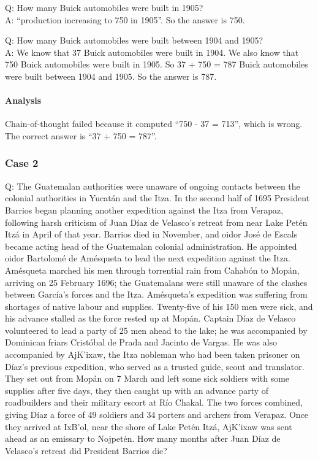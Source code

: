 Q: How many Buick automobiles were built in 1905?\\
A: ``production increasing to 750 in 1905''. So the answer is 750.

Q: How many Buick automobiles were built between 1904 and 1905?\\
A: We know that 37 Buick automobiles were built in 1904. We also know that 750 Buick automobiles were built in 1905. So 37 + 750 = 787 Buick automobiles were built between 1904 and 1905. So the answer is 787.

\paragraph{Analysis}
Chain-of-thought failed because it computed ``750 - 37 = 713'', which is wrong. The correct answer is ``37 + 750 = 787''.

\subsubsection{Case 2}
Q: The Guatemalan authorities were unaware of ongoing contacts between the colonial authorities in Yucatán and the Itza. In the second half of 1695 President Barrios began planning another expedition against the Itza from Verapaz, following harsh criticism of Juan Díaz de Velasco's retreat from near Lake Petén Itzá in April of that year. Barrios died in November, and oidor José de Escals became acting head of the Guatemalan colonial administration. He appointed oidor Bartolomé de Amésqueta to lead the next expedition against the Itza. Amésqueta marched his men through torrential rain from Cahabón to Mopán, arriving on 25 February 1696; the Guatemalans were still unaware of the clashes between García's forces and the Itza. Amésqueta's expedition was suffering from shortages of native labour and supplies. Twenty-five of his 150 men were sick, and his advance stalled as the force rested up at Mopán. Captain Díaz de Velasco volunteered to lead a party of 25 men ahead to the lake; he was accompanied by Dominican friars Cristóbal de Prada and Jacinto de Vargas. He was also accompanied by AjK'ixaw, the Itza nobleman who had been taken prisoner on Díaz's previous expedition, who served as a trusted guide, scout and translator. They set out from Mopán on 7 March and left some sick soldiers with some supplies after five days, they then caught up with an advance party of roadbuilders and their military escort at Río Chakal. The two forces combined, giving Díaz a force of 49 soldiers and 34 porters and archers from Verapaz. Once they arrived at IxB'ol, near the shore of Lake Petén Itzá, AjK'ixaw was sent ahead as an emissary to Nojpetén. How many months after Juan Díaz de Velasco's retreat did President Barrios die?

